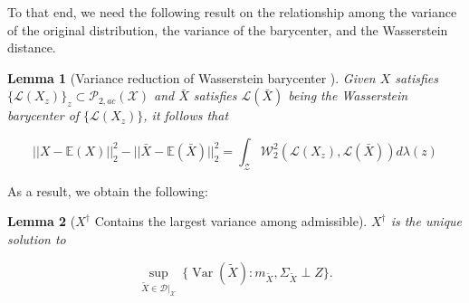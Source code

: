 \documentclass[twoside,11pt]{article}
\newtheorem{lem}{Lemma}[section]{\bfseries}{\itshape}
\DeclareMathOperator{\var}{Var}
\begin{document}
To that end, we need the following result on the relationship among the variance of the original distribution, the variance of the barycenter, and the Wasserstein distance.

\begin{lem} [Variance reduction of Wasserstein barycenter \cite{tabak2018explanation}] \label{l:Variance Reduction of the Barycenter}
Given $X$ satisfies $\{\mathcal{L}(X_z)\}_z \subset \mathcal{P}_{2,ac}(\mathcal{X})$ and $\bar{X}$ satisfies $\mathcal{L}(\bar{X})$ being the Wasserstein barycenter of $\{\mathcal{L}(X_z)\}$, it follows that

\begin{equation}
||X - \mathbb{E}(X)||_2^2 - ||\bar{X} - \mathbb{E}(\bar{X})||_2^2 = \int_{\mathcal{Z}} \mathcal{W}_2^2(\mathcal{L}(X_z), \mathcal{L}(\bar{X})) d\lambda(z)
\end{equation}

\end{lem}

As a result, we obtain the following:

\begin{lem}[$X^{\dag}$ Contains the largest variance among admissible] \label{l:Pseudo-barycenter Contains the Largest Variance}
$X^{\dag}$ is the unique solution to

\begin{equation}
\sup_{\tilde{X} \in \mathcal{D}|_{\mathcal{X}}} \ \{ \var(\tilde{X}) : m_{\tilde{X}},  \Sigma_{\tilde{X}} \perp Z \}.
\end{equation}

\end{lem}
\end{document}
